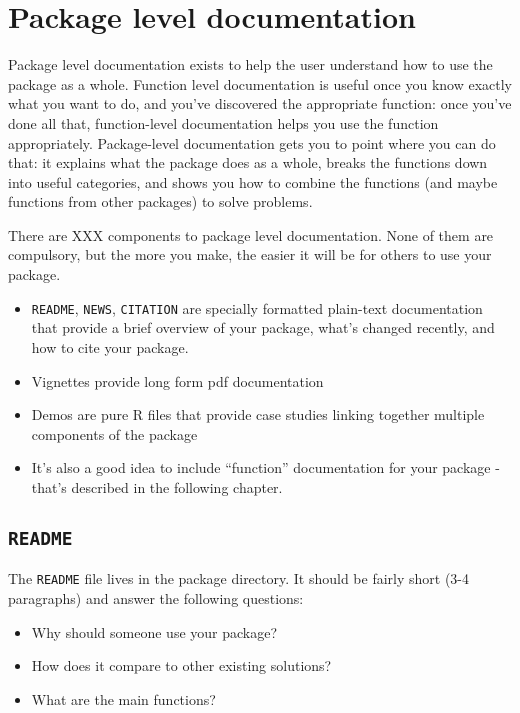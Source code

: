 \chapter{Package level documentation}

Package level documentation exists to help the user understand how to
use the package as a whole. Function level documentation is useful once
you know exactly what you want to do, and you've discovered the
appropriate function: once you've done all that, function-level
documentation helps you use the function appropriately. Package-level
documentation gets you to point where you can do that: it explains what
the package does as a whole, breaks the functions down into useful
categories, and shows you how to combine the functions (and maybe
functions from other packages) to solve problems.

There are XXX components to package level documentation. None of them
are compulsory, but the more you make, the easier it will be for others
to use your package.

\begin{itemize}
\item
  \texttt{README}, \texttt{NEWS}, \texttt{CITATION} are specially
  formatted plain-text documentation that provide a brief overview of
  your package, what's changed recently, and how to cite your package.
\item
  Vignettes provide long form pdf documentation
\item
  Demos are pure R files that provide case studies linking together
  multiple components of the package
\item
  It's also a good idea to include ``function'' documentation for your
  package - that's described in the following chapter.
\end{itemize}

\section{\texttt{README}}

The \texttt{README} file lives in the package directory. It should be
fairly short (3-4 paragraphs) and answer the following questions:

\begin{itemize}
\itemsep1pt\parskip0pt
\item
  Why should someone use your package?
\item
  How does it compare to other existing solutions?
\item
  What are the main functions?
\end{itemize}

